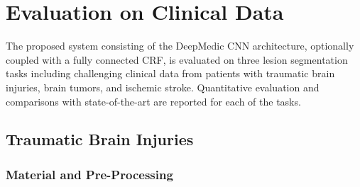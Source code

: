 


\section{Evaluation on Clinical Data}
\label{sec:evaluation}

The proposed system consisting of the DeepMedic CNN architecture, optionally coupled with a fully connected CRF, is evaluated on three lesion segmentation tasks including challenging clinical data from patients with traumatic brain injuries, brain tumors, and ischemic stroke. Quantitative evaluation and comparisons with state-of-the-art are reported for each of the tasks.

\subsection{Traumatic Brain Injuries}
\label{subsec:evalTbi}

\subsubsection{Material and Pre-Processing}
\label{subsubsec:materialTbi}

